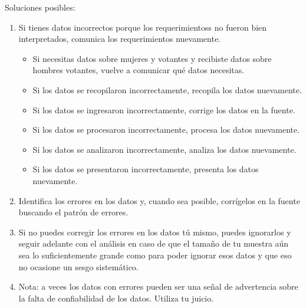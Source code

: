 Soluciones posibles:
\begin{enumerate}
    \item Si tienes datos incorrectos porque los requerimientoss no fueron bien interpretados, comunica los requerimientos nuevamente.
    \begin{example}
        \begin{itemize}
            \item Si necesitas datos sobre mujeres y votantes y recibiste datos sobre hombres votantes, vuelve a comunicar qu\'e datos necesitas.
            \item Si los datos se recopilaron incorrectamente, recopila los datos nuevamente.
            \item Si los datos se ingresaron incorrectamente, corrige los datos en la fuente.
            \item Si los datos se procesaron incorrectamente, procesa los datos nuevamente.
            \item Si los datos se analizaron incorrectamente, analiza los datos nuevamente.
            \item Si los datos se presentaron incorrectamente, presenta los datos nuevamente.
        \end{itemize}
    \end{example}
    \item Identifica los errores en los datos y, cuando sea posible, corr\'igelos en la fuente buscando el patr\'on de errores.
    \item Si no puedes corregir los errores en los datos t\'u mismo, puedes ignorarlos y seguir adelante con el an\'alisis en caso 
          de que el tama\~no de tu muestra a\'un sea lo suficientemente grande como para poder ignorar esos datos y que eso no ocasione un sesgo sistem\'atico.
    \item Nota: a veces los datos con errores pueden ser una se\~nal de advertencia sobre la falta de confiabilidad de los datos. Utiliza tu juicio.
\end{enumerate}

